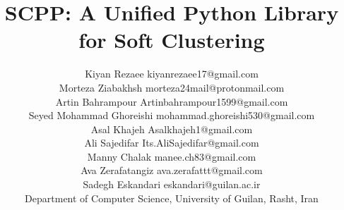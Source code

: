 \documentclass[twoside,11pt]{article}
\begin{document}
\title{SCPP: A Unified Python Library for Soft Clustering}


\author{%
\name Kiyan Rezaee \email kiyanrezaee17@gmail.com \\
\name Morteza Ziabakhsh \email morteza24mail@protonmail.com \\
\name Artin Bahrampour \email Artinbahrampour1599@gmail.com \\
\name Seyed Mohammad Ghoreishi \email mohammad.ghoreishi530@gmail.com \\
\name Asal Khajeh \email Asalkhajeh1@gmail.com \\
\name Ali Sajedifar \email Its.AliSajedifar@gmail.com \\
\name Manny Chalak \email manee.ch83@gmail.com \\
\name Ava Zerafatangiz \email ava.zerafattt@gmail.com \\
\name Sadegh Eskandari \email eskandari@guilan.ac.ir  \\
\addr Department of Computer Science, University of Guilan, Rasht, Iran%
}

\editor{}

\maketitle
\end{document}

